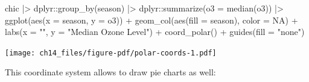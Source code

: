 \documentclass[
  letterpaper,
]{scrbook}
\newenvironment{Shaded}{\begin{snugshade}}{\end{snugshade}}
\newcommand{\AttributeTok}[1]{\textcolor[rgb]{0.40,0.45,0.13}{#1}}
\newcommand{\ConstantTok}[1]{\textcolor[rgb]{0.56,0.35,0.01}{#1}}
\newcommand{\FunctionTok}[1]{\textcolor[rgb]{0.28,0.35,0.67}{#1}}
\newcommand{\NormalTok}[1]{\textcolor[rgb]{0.00,0.23,0.31}{#1}}
\newcommand{\SpecialCharTok}[1]{\textcolor[rgb]{0.37,0.37,0.37}{#1}}
\newcommand{\StringTok}[1]{\textcolor[rgb]{0.13,0.47,0.30}{#1}}
\begin{document}
\begin{Shaded}
\begin{Highlighting}[]
\NormalTok{chic }\SpecialCharTok{|\textgreater{}}
\NormalTok{  dplyr}\SpecialCharTok{::}\FunctionTok{group\_by}\NormalTok{(season) }\SpecialCharTok{|\textgreater{}}
\NormalTok{  dplyr}\SpecialCharTok{::}\FunctionTok{summarize}\NormalTok{(}\AttributeTok{o3 =} \FunctionTok{median}\NormalTok{(o3)) }\SpecialCharTok{|\textgreater{}}
  \FunctionTok{ggplot}\NormalTok{(}\FunctionTok{aes}\NormalTok{(}\AttributeTok{x =}\NormalTok{ season, }\AttributeTok{y =}\NormalTok{ o3)) }\SpecialCharTok{+}
    \FunctionTok{geom\_col}\NormalTok{(}\FunctionTok{aes}\NormalTok{(}\AttributeTok{fill =}\NormalTok{ season), }\AttributeTok{color =} \ConstantTok{NA}\NormalTok{) }\SpecialCharTok{+}
    \FunctionTok{labs}\NormalTok{(}\AttributeTok{x =} \StringTok{""}\NormalTok{, }\AttributeTok{y =} \StringTok{"Median Ozone Level"}\NormalTok{) }\SpecialCharTok{+}
    \FunctionTok{coord\_polar}\NormalTok{() }\SpecialCharTok{+}
    \FunctionTok{guides}\NormalTok{(}\AttributeTok{fill =} \StringTok{"none"}\NormalTok{)}
\end{Highlighting}
\end{Shaded}

\texttt{[image: ch14\_files/figure-pdf/polar-coords-1.pdf]}

This coordinate system allows to draw pie charts as well:
\end{document}
